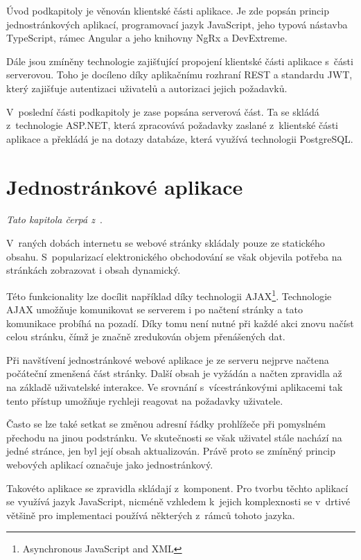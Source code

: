Úvod podkapitoly je věnován klientské části aplikace. Je zde popsán princip jednostránkových aplikací, programovací jazyk JavaScript, jeho typová nástavba TypeScript, rámec Angular a jeho knihovny NgRx a DevExtreme.

Dále jsou zmíněny technologie zajišťující propojení klientské části aplikace s~části serverovou. Toho je docíleno díky aplikačnímu rozhraní REST a standardu JWT, který zajišťuje autentizaci uživatelů a autorizaci jejich požadavků.

V~poslední části podkapitoly je zase popsána serverová část. Ta se skládá z~technologie ASP.NET, která zpracovává požadavky zaslané z~klientské části aplikace a překládá je na dotazy databáze, která využívá technologii PostgreSQL.


\section{Jednostránkové aplikace}\label{sec:spa}

\emph{Tato kapitola čerpá z~\cite{bib:spa}}.

V~raných dobách internetu se webové stránky skládaly pouze ze statického obsahu. S~popularizací elektronického obchodování se však objevila potřeba na stránkách zobrazovat i obsah dynamický. 

Této funkcionality lze docílit například díky technologii AJAX\footnote{Asynchronous JavaScript and XML}. Technologie AJAX umožňuje komunikovat se serverem i po načtení stránky a tato komunikace probíhá na pozadí. Díky tomu není nutné při každé akci znovu načíst celou stránku, čímž je značně zredukován objem přenášených dat.

Při navštívení jednostránkové webové aplikace je ze serveru nejprve načtena počáteční zmenšená část stránky. Další obsah je vyžádán a načten zpravidla až na základě uživatelské interakce. Ve srovnání s~vícestránkovými aplikacemi tak tento přístup umožňuje rychleji reagovat na požadavky uživatele.

Často se lze také setkat se změnou adresní řádky prohlížeče při pomyslném přechodu na jinou podstránku. Ve skutečnosti se však uživatel stále nachází na jedné stránce, jen byl její obsah aktualizován. Právě proto se zmíněný princip webových aplikací označuje jako jednostránkový.

Takovéto aplikace se zpravidla skládají z~komponent. Pro tvorbu těchto aplikací se využívá jazyk JavaScript, nicméně vzhledem k~jejich komplexnosti se v~drtivé většině pro implementaci používá některých z~rámců tohoto jazyka.



